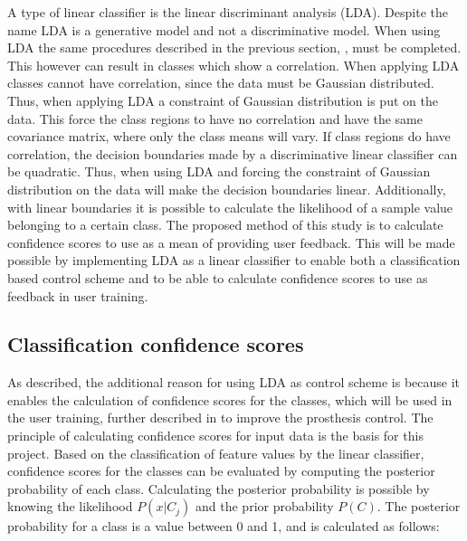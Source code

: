 A type of linear classifier is the linear discriminant analysis (LDA). Despite the name LDA is a generative model and not a discriminative model. \cite{Duda2000} 
When using LDA the same procedures described in the previous section, , must be completed. This however can result in classes which show a correlation. When applying LDA classes cannot have correlation, since the data must be Gaussian distributed. Thus, when applying LDA a constraint of Gaussian distribution is put on the data. This force the class regions to have no correlation and have the same covariance matrix, where only the class means will vary.
If class regions do have correlation, the decision boundaries made by a discriminative linear classifier can be quadratic. Thus, when using LDA and forcing the constraint of Gaussian distribution on the data will make the decision boundaries linear. Additionally, with linear boundaries it is possible to calculate the likelihood of a sample value belonging to a certain class. \cite{Fisher1936, Duda2000}
The proposed method of this study is to calculate confidence scores to use as a mean of providing user feedback. This will be made possible by implementing LDA as a linear classifier to enable both a classification based control scheme and to be able to calculate confidence scores to use as feedback in user training. 


\subsection{Classification confidence scores} \label{sub:BG:classificationConfidenceScores}
As described, the additional reason for using LDA as control scheme is because it enables the calculation of confidence scores for the classes, which will be used in the user training, further described in  to improve the prosthesis control. The principle of calculating confidence scores for input data is the basis for this project. 
Based on the classification of feature values by the linear classifier, confidence scores for the classes can be evaluated by computing the posterior probability of each class. Calculating the posterior probability is possible by knowing the likelihood $P(x|C_j)$ and the prior probability $P(C)$.
The posterior probability for a class is a value between 0 and 1, and is calculated as follows:

